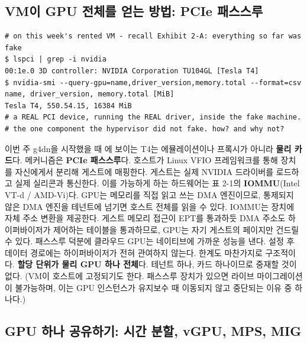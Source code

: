 \subsection*{VM이 GPU 전체를 얻는 방법: PCIe 패스스루}

\begin{terminalbox}
\begin{Verbatim}[breaklines=true,breakanywhere=true,fontsize=\small,formatcom=\color{tbbtermfg},codes=\tbbcodeactive]
# on this week's rented VM - recall Exhibit 2-A: everything so far was fake
$ lspci | grep -i nvidia
00:1e.0 3D controller: NVIDIA Corporation TU104GL [Tesla T4]
$ nvidia-smi --query-gpu=name,driver_version,memory.total --format=csv
name, driver_version, memory.total [MiB]
Tesla T4, 550.54.15, 16384 MiB
# a REAL PCI device, running the REAL driver, inside the fake machine.
# the one component the hypervisor did not fake. how? and why not?
\end{Verbatim}
\end{terminalbox}

이번 주 g4dn을 시작했을 때 에 보이는 T4는 에뮬레이션이나 프록시가 아니라 \textbf{물리 카드}다. 메커니즘은 \textbf{PCIe 패스스루}다. 호스트가 Linux VFIO 프레임워크를 통해 장치를 자신에게서 분리해 게스트에 매핑한다. 게스트는 실제 NVIDIA 드라이버를 로드하고 실제 실리콘과 통신한다. 이를 가능하게 하는 하드웨어는 표 2-1의 \textbf{IOMMU}(Intel VT-d / AMD-Vi)다. GPU는 메모리를 직접 읽고 쓰는 DMA 엔진이므로, 통제되지 않은 DMA 엔진을 테넌트에 넘기면 호스트 전체를 읽을 수 있다. IOMMU는 장치에 자체 주소 변환을 제공한다. 게스트 메모리 접근이 EPT를 통과하듯 DMA 주소도 하이퍼바이저가 제어하는 테이블을 통과하므로, GPU는 자기 게스트의 페이지만 건드릴 수 있다. 패스스루 덕분에 클라우드 GPU는 네이티브에 가까운 성능을 낸다. 설정 후 데이터 경로에는 하이퍼바이저가 전혀 관여하지 않는다. 한계도 마찬가지로 구조적이다. \textbf{할당 단위가 물리 GPU 하나 전체}다. 테넌트 하나, 카드 하나이므로 중재할 것이 없다. (VM이 호스트에 고정되기도 한다. 패스스루 장치가 있으면 라이브 마이그레이션이 불가능하며, 이는 GPU 인스턴스가 유지보수 때 이동되지 않고 중단되는 이유 중 하나다.)

\subsection*{GPU 하나 공유하기: 시간 분할, vGPU, MPS, MIG}


